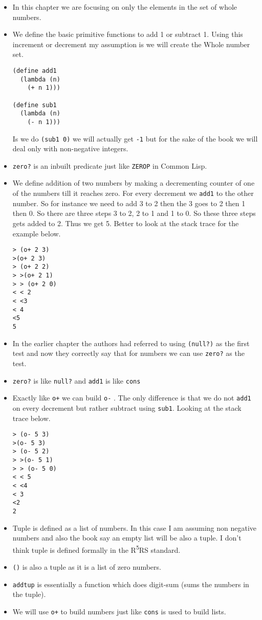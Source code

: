 \documentclass[11pt]{article}
\begin{document}
\begin{itemize}
\item In this chapter we are focusing on only the elements in the set of whole numbers.
\item We define the basic primitive functions to add 1 or subtract 1. Using this increment or decrement my assumption is we will create the Whole
number set.
\begin{verbatim}
(define add1
  (lambda (n)
    (+ n 1)))

(define sub1
  (lambda (n)
    (- n 1)))

\end{verbatim}
Is we do \texttt{(sub1 0)} we will actually get \texttt{-1} but for the sake of the book we will deal only with non-negative integers.
\item \texttt{zero?} is an inbuilt predicate just like \texttt{ZEROP} in Common Lisp.
\item We define addition of two numbers by making a decrementing counter of one of the numbers till it reaches zero. For every decrement we \texttt{add1}
to the other number. So for instance we need to add 3 to 2 then the 3 goes to 2 then 1 then 0. So there are three steps 3 to 2, 2 to 1 and 1
to 0. So these three steps gets added to 2. Thus we get 5. Better to look at the stack trace for the example below.

\begin{verbatim}
> (o+ 2 3)
>(o+ 2 3)
> (o+ 2 2)
> >(o+ 2 1)
> > (o+ 2 0)
< < 2
< <3
< 4
<5
5

\end{verbatim}
\item In the earlier chapter the authors had referred to using \texttt{(null?)} as the first test and now they correctly say that for numbers we can
use \texttt{zero?} as the test.
\item \texttt{zero?} is like \texttt{null?} and \texttt{add1} is like \texttt{cons}
\item Exactly like \texttt{o+} we can build \texttt{o-} . The only difference is that we do not \texttt{add1} on every decrement but rather subtract using \texttt{sub1}. Looking
at the stack trace below.
\begin{verbatim}
> (o- 5 3)
>(o- 5 3)
> (o- 5 2)
> >(o- 5 1)
> > (o- 5 0)
< < 5
< <4
< 3
<2
2

\end{verbatim}
\item Tuple is defined as a list of numbers. In this case I am assuming non negative numbers and also the book say an empty list will be also a
tuple. I don't think tuple is defined formally in the R\textsuperscript{5}RS standard.
\item \texttt{()} is also a tuple as it is a list of zero numbers.
\item \texttt{addtup} is essentially a function which does digit-sum (sums the numbers in the tuple).
\item We will use \texttt{o+} to build numbers just like \texttt{cons} is used to build lists.
\end{itemize}
\end{document}
